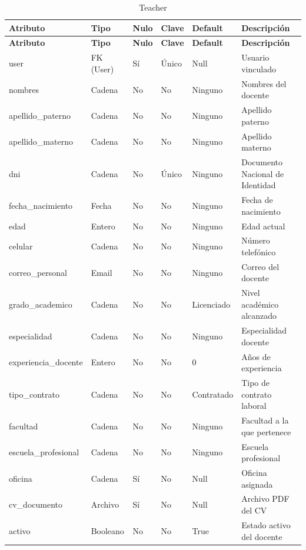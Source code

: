 \documentclass{article}
\begin{document}
\begin{longtable}{|l|l|l|l|l|l|}
\caption{Teacher} \\
\hline
\rowcolor{tabledictionariesbackground}
\textbf{Atributo} & \textbf{Tipo} & \textbf{Nulo} & \textbf{Clave} & \textbf{Default} & \textbf{Descripción} \\
\hline
\endfirsthead

\hline
\rowcolor{tabledictionariesbackground}
\textbf{Atributo} & \textbf{Tipo} & \textbf{Nulo} & \textbf{Clave} & \textbf{Default} & \textbf{Descripción} \\
\hline
\endhead

user & FK (User) & Sí & Único & Null & Usuario vinculado \\
nombres & Cadena & No & No & Ninguno & Nombres del docente \\
apellido\_paterno & Cadena & No & No & Ninguno & Apellido paterno \\
apellido\_materno & Cadena & No & No & Ninguno & Apellido materno \\
dni & Cadena & No & Único & Ninguno & Documento Nacional de Identidad \\
fecha\_nacimiento & Fecha & No & No & Ninguno & Fecha de nacimiento \\
edad & Entero & No & No & Ninguno & Edad actual \\
celular & Cadena & No & No & Ninguno & Número telefónico \\
correo\_personal & Email & No & No & Ninguno & Correo del docente \\
grado\_academico & Cadena & No & No & Licenciado & Nivel académico alcanzado \\
especialidad & Cadena & No & No & Ninguno & Especialidad docente \\
experiencia\_docente & Entero & No & No & 0 & Años de experiencia \\
tipo\_contrato & Cadena & No & No & Contratado & Tipo de contrato laboral \\
facultad & Cadena & No & No & Ninguno & Facultad a la que pertenece \\
escuela\_profesional & Cadena & No & No & Ninguno & Escuela profesional \\
oficina & Cadena & Sí & No & Null & Oficina asignada \\
cv\_documento & Archivo & Sí & No & Null & Archivo PDF del CV \\
activo & Booleano & No & No & True & Estado activo del docente \\
\hline
\end{longtable}
\end{document}
